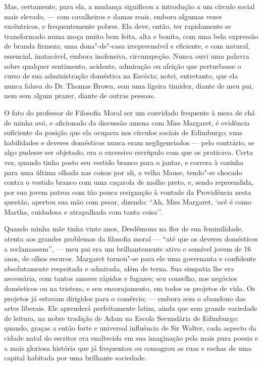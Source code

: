 Mas, certamente, para ela, a mudança significou a introdução a um
círculo social mais elevado, --- com cavalheiros e damas reais, embora
algumas vezes excêntricos, e frequentemente pobres. Ela deve, então, ter
rapidamente se transformado numa moça muito bem feita, alta e bonita,
com uma bela expressão de branda firmeza; uma dona"-de"-casa
irrepreensível e eficiente, e com natural, essencial, inatacável, embora
inofensiva, circunspeção. Nunca ouvi uma palavra sobre qualquer
sentimento, acidente, admiração ou afeição que perturbasse o curso de
sua administração doméstica na Escócia; notei, entretanto, que ela nunca
falava do Dr.\,Thomas Brown, sem uma ligeira timidez, diante de meu pai,
nem sem algum prazer, diante de outras pessoas.

O fato do professor de Filosofia Moral ser um convidado frequente à
mesa de chá de minha avó, e aficionado da discussão amena com Miss
Margaret, é evidência suficiente da posição que ela ocupava nos círculos
sociais de Edimburgo; suas habilidades e deveres domésticos nunca eram
negligenciados --- pelo contrário, se algo pudesse ser objetado, era o
excessivo escrúpulo com que os praticava. Certa vez, quando tinha posto
seu vestido branco para o jantar, e correra à cozinha para uma última
olhada nas coisas por ali, a velha Mause, tendo"-se chocado contra o
vestido branco com uma caçarola de molho preto, e, sendo repreendida,
por sua jovem patroa com tão pouca resignação à vontade da Providência
nesta questão, apertou sua mão com pesar, dizendo: ``Ah, Miss Margaret,
`ocê é como Martha, cuidadosa e atrapalhada com tanta coisa''.

Quando minha mãe tinha vinte anos, Desdêmona na flor de sua
feminilidade, atenta aos grandes problemas da filosofia moral --- ``até
que os deveres domésticos a reclamassem'', --- meu pai era um
brilhantemente ativo e sensível jovem de 16 anos, de olhos escuros.
Margaret tornou"-se para ele uma governanta e confidente absolutamente
respeitada e admirada, além de terna. Sua simpatia lhe era necessária,
com tantos amores rápidos e fugazes; seu conselho, nos negócios
domésticos ou na tristeza, e seu encorajamento, em todos os projetos de
vida. Os projetos já estavam dirigidos para o comércio; --- embora sem o
abandono das artes liberais. Ele aprenderá perfeitamente latim, ainda
que sem grande variedade de leitura, na nobre tradição de Adam na Escola
Secundária de Edimburgo: quando, graças a então forte e universal
influência de Sir Walter, cada aspecto da cidade natal do escritor era
enaltecida em sua imaginação pela mais pura poesia e a mais gloriosa
história que já frequentou ou consagrou as ruas e rochas de uma capital
habitada por uma brilhante sociedade.

